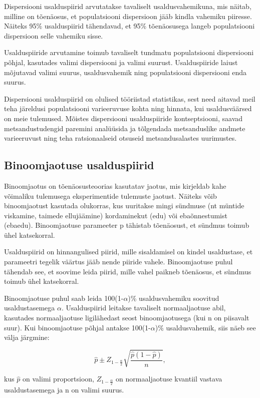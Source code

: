 \documentclass[
]{book}
\begin{document}
Dispersiooni usalduspiirid arvutatakse tavaliselt usaldusvahemikuna, mis näitab, milline on tõenäosus, et populatsiooni dispersioon jääb kindla vahemiku piiresse. Näiteks 95\% usalduspiirid tähendavad, et 95\% tõenäosusega langeb populatsiooni dispersioon selle vahemiku sisse.

Usalduspiiride arvutamine toimub tavaliselt tundmatu populatsiooni dispersiooni põhjal, kasutades valimi dispersiooni ja valimi suurust. Usalduspiiride laiust mõjutavad valimi suurus, usaldusvahemik ning populatsiooni dispersiooni enda suurus.

Dispersiooni usalduspiirid on olulised tööriistad statistikas, sest need aitavad meil teha järeldusi populatsiooni varieeruvuse kohta ning hinnata, kui usaldusväärsed on meie tulemused. Mõistes dispersiooni usalduspiiride kontseptsiooni, saavad metsandustudengid paremini analüüsida ja tõlgendada metsanduslike andmete varieeruvust ning teha ratsionaalseid otsuseid metsandusalastes uurimustes.

\subsection{Binoomjaotuse usalduspiirid}\label{binoomjaotuse-usalduspiirid}

Binoomjaotus on tõenäosusteoorias kasutatav jaotus, mis kirjeldab kahe võimaliku tulemusega eksperimentide tulemuste jaotust. Näiteks võib binoomjaotust kasutada olukorras, kus uuritakse mingi sündmuse (nt müntide viskamine, taimede ellujäämine) kordaminekut (edu) või ebaõnnestumist (ebaedu). Binoomjaotuse parameeter p tähistab tõenäosust, et sündmus toimub ühel katsekorral.

Usalduspiirid on hinnangulised piirid, mille sisaldamisel on kindel usaldustase, et parameetri tegelik väärtus jääb nende piiride vahele. Binoomjaotuse puhul tähendab see, et soovime leida piirid, mille vahel paikneb tõenäosus, et sündmus toimub ühel katsekorral.

Binoomjaotuse puhul saab leida 100(1-\(\alpha\))\% usaldusvahemiku soovitud usaldustasemega \(\alpha\). Usalduspiirid leitakse tavaliselt normaaljaotuse abil, kasutades normaaljaotuse ligilähedast seost binoomjaotusega (kui n on piisavalt suur). Kui binoomjaotuse põhjal antakse 100(1-\(\alpha\))\% usaldusvahemik, siis näeb see välja järgmine:

\[
\hat{p} ± Z_{1-\frac{\alpha}{2}} \sqrt{\frac{\hat{p}(1-\hat{p})}{n}},
\]

kus \(\hat{p}\) on valimi proportsioon, \(Z_{1-\frac{\alpha}{2}}\) on normaaljaotuse kvantiil vastava usaldustasemega ja n on valimi suurus.
\end{document}
